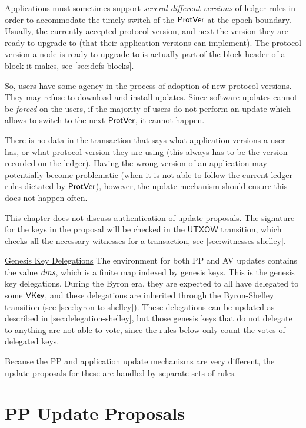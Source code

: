 Applications must sometimes support \textit{several different versions}
of ledger rules in order to accommodate the timely switch of the $\mathsf{ProtVer}$ at the
epoch boundary. Usually, the currently accepted protocol version, and next the
version they are ready to upgrade to (that their application versions can
implement).
The protocol version a node is ready to upgrade to is actually part of the block
header of a block it makes, see \ref{sec:defs-blocks}.

So, users have some agency in the process of adoption of
new protocol versions. They may refuse to download and install updates.
Since software updates cannot be \textit{forced} on the users, if the majority of
users do not perform an update which allows to switch to the next $\mathsf{ProtVer}$,
it cannot happen.

There is no data in the transaction that says what application
versions a user has, or what protocol version they are using (this always has to
be the version recorded on the ledger).
Having the wrong version of an application
may potentially become problematic (when it is not able to follow the current
ledger rules dictated by $\mathsf{ProtVer}$), however, the update mechanism should
ensure this does not happen often.

This chapter does not discuss authentication of update proposals.
The signature for the keys in the proposal will be checked in the
$\mathsf{UTXOW}$ transition, which checks all the necessary witnesses
for a transaction, see \ref{sec:witnesses-shelley}.

\begin{note}
\underline{Genesis Key Delegations}
\newline
\noindent The environment for both PP and AV updates contains
the value $\mathit{dms}$, which is a finite map indexed by genesis keys.
This is the genesis key delegations. During the Byron era, they are expected
to all have delegated to some $\mathsf{VKey}$, and these delegations are inherited
through the Byron-Shelley transition (see \ref{sec:byron-to-shelley}).
These delegations can be updated as described in \ref{sec:delegation-shelley},
but those genesis keys that do not delegate to anything are not able to vote,
since the rules below only count the votes of delegated keys.
\end{note}

Because the PP and application update mechanisms are very different, the
update proposals for these are handled by separate sets of rules.

\section{PP Update Proposals}
\label{sec:pp-proposals}

